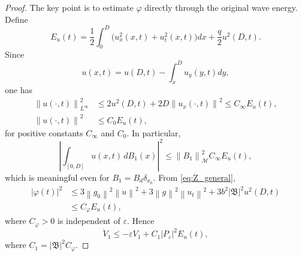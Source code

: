 \documentclass[journal]{IEEEtran}
\newcommand{\eps}{\varepsilon}
\newcommand{\Bcal}{\mathfrak B}
\newcommand{\Mcal}{\mathcal M}
\newcommand{\norm}[1]{\left\|#1\right\|}
\newcommand{\abs}[1]{\left|#1\right|}
\begin{document}
\begin{proof}
The key point is to estimate $\varphi$ directly through the original wave energy. Define
\begin{equation}
 E_u(t)=\frac12\int_0^D\big(u_x^2(x,t)+u_t^2(x,t)\big)dx
 +\frac q2u^2(D,t).\label{eq:Eu_def}
\end{equation}
Since
\begin{equation}
 u(x,t)=u(D,t)-\int_x^D u_y(y,t)dy,
\end{equation}
one has
\begin{align}
 \norm{u(\cdot,t)}_{L^\infty}^2&\le
 2u^2(D,t)+2D\norm{u_x(\cdot,t)}^2\le C_\infty E_u(t),\label{eq:Linf_Eu}\\
 \norm{u(\cdot,t)}^2&\le C_0E_u(t),\label{eq:L2_Eu}
\end{align}
for positive constants $C_\infty$ and $C_0$. In particular,
\begin{equation}
 \left|\int_{[0,D]}u(x,t)\,dB_1(x)\right|^2
 \le \norm{B_1}_{\Mcal}^2 C_\infty E_u(t),\label{eq:measure_pair_bound}
\end{equation}
which is meaningful even for $B_1=B_d\delta_{x_0}$.
From \eqref{eq:Z_general},
\begin{align}
 \abs{\varphi(t)}^2
&\le 3\norm{g_0}^2\norm{u}^2
 +3\norm{g}^2\norm{u_t}^2+3b^2\abs{\Bcal}^2u^2(D,t)\nonumber\\
&\le C_\varphi E_u(t),\label{eq:phi_Eu}
\end{align}
where $C_\varphi>0$ is independent of $\eps$. Hence
\begin{equation}
 \dot V_1\le -\eps V_1+C_1\abs{P_\eps}^2E_u(t),\label{eq:V1dot_Eu}
\end{equation}
where $C_1=\abs{\Bcal}^2C_\varphi$.


\end{proof}
\end{document}
